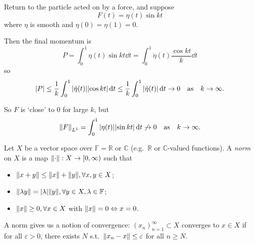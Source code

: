 \documentclass[a4paper,11pt]{article}
\begin{document}
	\begin{ex}
		Return to the particle acted on by a force, and suppose $$F(t) = \eta(t) \sin kt$$where $\eta$ is smooth and $\eta(0) = \eta(1) = 0$.

		\begin{center}
		\end{center}

		Then the final momentum is 
		\[
			P = \int_{0}^{1} \eta(t) \sin kt \dd{t} = \int_{0}^{1} \dot{\eta}(t) \frac{\cos kt}{k} \dd{t}
		\]
		so
		\[
			\abs{P} \leq \frac{1}{k} \int_{0}^{1} \abs{\dot{\eta}(t)}\abs{\cos kt} \dd{t} \leq \frac{1}{k} \int_{0}^{1} \abs{\dot \eta(t)} \dd{t} \to 0 \quad \text{as} \quad k \to \infty.
		\]
		
		So $F$ is `close' to $0$ for large $k$, but 
		\[
			\norm{F}_{L^1} = \int_{0}^{1} \abs{\eta(t)} \abs{\sin kt } \dd{t} \not\to 0 \quad \text{as} \quad k \to \infty.
		\]
	\end{ex}
	
	\begin{defi}
		Let $X$ be a vector space over $\mathbb{F} = \mathbb{R}$ or $\mathbb{C}$ (e.g.\ $\mathbb{R}$ or $\mathbb{C}$-valued functions). A \emph{norm} on $X$ is a map $\norm{\cdot} : X \to [0,\infty)$ such that 
		\begin{itemize}
			\item $\norm{x+y} \leq \norm{x} + \norm{y}, \forall x,y \in X$;
			\item $\norm{\lambda y} = \abs{\lambda} \norm{y},  \forall y \in X, \lambda \in \mathbb{F}$;
			\item $\norm{x} \geq 0,  \forall x \in X$ with $\norm{x} = 0 \Leftrightarrow  x = 0$. 
		\end{itemize} 
	\end{defi}

	A norm gives us a notion of convergence: $(x_n)_{n=1}^{\infty} \subset X$ converges to $x \in X$ if for all $\varepsilon > 0$, there exists $N$ s.t.\ $\norm{x_n - x} \leq \varepsilon$ for all $n \geq N$.
	
\end{document}
